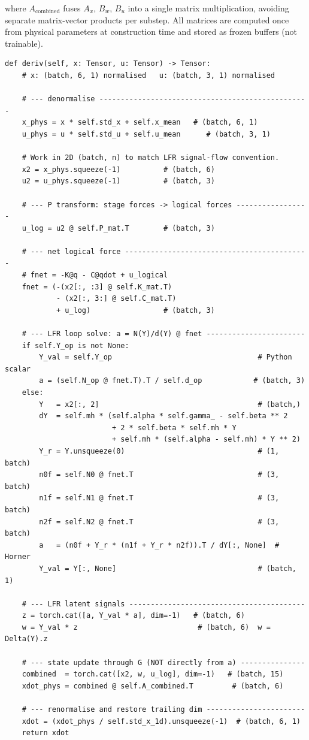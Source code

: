 \documentclass[11pt,a4paper]{article}
\newcommand{\codetitle}[2]{\small\texttt{#1}\quad lines #2}
\begin{document}
where $A_{\mathrm{combined}}$ fuses $A_x$, $B_w$, $B_u$ into a single
matrix multiplication, avoiding separate matrix-vector products per substep.
All matrices are computed once from physical parameters at construction time
and stored as frozen buffers (not trainable).

\begin{lstlisting}[style=py,
  title={\codetitle{model\_augmentation/fit\_systems/blocks.py}{771--822} -- \texttt{Gantry\_State\_Block.deriv()}},
  firstnumber=771]
def deriv(self, x: Tensor, u: Tensor) -> Tensor:
    # x: (batch, 6, 1) normalised   u: (batch, 3, 1) normalised

    # --- denormalise -------------------------------------------------
    x_phys = x * self.std_x + self.x_mean   # (batch, 6, 1)
    u_phys = u * self.std_u + self.u_mean      # (batch, 3, 1)

    # Work in 2D (batch, n) to match LFR signal-flow convention.
    x2 = x_phys.squeeze(-1)          # (batch, 6)
    u2 = u_phys.squeeze(-1)          # (batch, 3)

    # --- P transform: stage forces -> logical forces -----------------
    u_log = u2 @ self.P_mat.T        # (batch, 3)

    # --- net logical force -------------------------------------------
    # fnet = -K@q - C@qdot + u_logical
    fnet = (-(x2[:, :3] @ self.K_mat.T)
            - (x2[:, 3:] @ self.C_mat.T)
            + u_log)                 # (batch, 3)

    # --- LFR loop solve: a = N(Y)/d(Y) @ fnet -----------------------
    if self.Y_op is not None:
        Y_val = self.Y_op                                  # Python scalar
        a = (self.N_op @ fnet.T).T / self.d_op            # (batch, 3)
    else:
        Y   = x2[:, 2]                                     # (batch,)
        dY  = self.mh * (self.alpha * self.gamma_ - self.beta ** 2
                         + 2 * self.beta * self.mh * Y
                         + self.mh * (self.alpha - self.mh) * Y ** 2)
        Y_r = Y.unsqueeze(0)                               # (1, batch)
        n0f = self.N0 @ fnet.T                             # (3, batch)
        n1f = self.N1 @ fnet.T                             # (3, batch)
        n2f = self.N2 @ fnet.T                             # (3, batch)
        a   = (n0f + Y_r * (n1f + Y_r * n2f)).T / dY[:, None]  # Horner
        Y_val = Y[:, None]                                 # (batch, 1)

    # --- LFR latent signals -----------------------------------------
    z = torch.cat([a, Y_val * a], dim=-1)   # (batch, 6)
    w = Y_val * z                            # (batch, 6)  w = Delta(Y).z

    # --- state update through G (NOT directly from a) ---------------
    combined  = torch.cat([x2, w, u_log], dim=-1)   # (batch, 15)
    xdot_phys = combined @ self.A_combined.T         # (batch, 6)

    # --- renormalise and restore trailing dim -----------------------
    xdot = (xdot_phys / self.std_x_1d).unsqueeze(-1)  # (batch, 6, 1)
    return xdot
\end{lstlisting}
\end{document}
